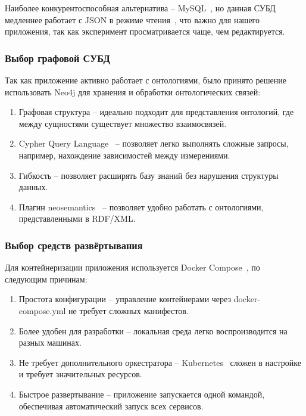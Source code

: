 Наиболее конкурентоспособная альтернатива – MySQL~\cite{DB:MySQL}, но данная СУБД медленнее работает с JSON в режиме чтения~\cite{Proofs:Postgres-vs-MySQL}, что важно для нашего приложения, так как эксперимент просматривается чаще, чем редактируется.

\subsubsection{Выбор графовой СУБД}

Так как приложение активно работает с онтологиями, было принято решение использовать Neo4j для хранения и обработки онтологических связей:
\begin{enumerate}
    \item Графовая структура -- идеально подходит для представления онтологий, где между сущностями существует множество взаимосвязей.
    \item Cypher Query Language~\cite{QueryLang:CypherQL} -- позволяет легко выполнять сложные запросы, например, нахождение зависимостей между измерениями.
    \item Гибкость -- позволяет расширять базу знаний без нарушения структуры данных.
    \item Плагин neosemantics~\cite{Library:NeoSemantics} – позволяет удобно работать с онтологиями, представленными в RDF/XML.
\end{enumerate}

\subsubsection{Выбор средств развёртывания}

Для контейнеризации приложения используется Docker Compose~\cite{Tool:DockerCompose}, по следующим причинам:
\begin{enumerate}
    \item Простота конфигурации -- управление контейнерами через docker-compose.yml не требует сложных манифестов.
    \item Более удобен для разработки -- локальная среда легко воспроизводится на разных машинах.
    \item Не требует дополнительного оркестратора -- Kubernetes~\cite{Tool:Kubernetes} сложен в настройке и требует значительных ресурсов.
    \item Быстрое развертывание -- приложение запускается одной командой, обеспечивая автоматический запуск всех сервисов.
\end{enumerate}

